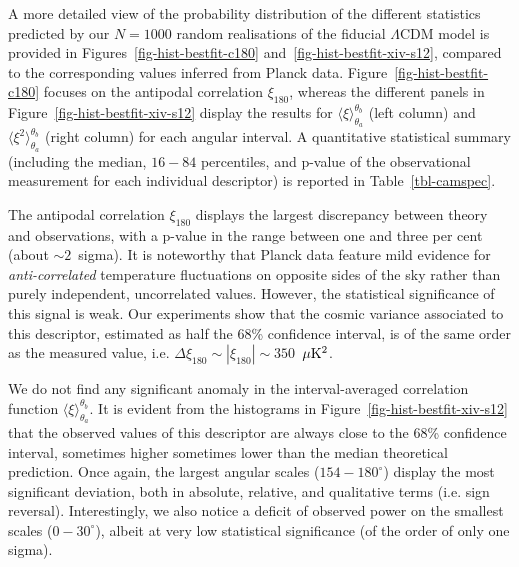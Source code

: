 \documentclass[apj,twocolumn,numberedappendix]{openjournal}
\begin{document}
A more detailed view of the probability distribution of the different statistics predicted by our $N=1000$ random realisations of the fiducial $\Lambda$CDM model is provided in Figures~\ref{fig-hist-bestfit-c180} and~\ref{fig-hist-bestfit-xiv-s12}, compared to the corresponding values inferred from Planck data.
Figure~\ref{fig-hist-bestfit-c180} focuses on the antipodal correlation $\xi_{180}$, whereas the different panels in Figure~\ref{fig-hist-bestfit-xiv-s12} display the results for
$\langle\xi\rangle_{\theta_a}^{\theta_b}$ (left column) and
$\langle\xi^2\rangle_{\theta_a}^{\theta_b}$ (right column)
for each angular interval.
A quantitative statistical summary (including the median, $16-84$ percentiles, and p-value of the observational measurement for each individual descriptor) is reported in Table~\ref{tbl-camspec}.


The antipodal correlation $\xi_{180}$ displays the largest discrepancy between theory and observations, with a p-value in the range between one and three per cent (about $\sim 2$~sigma).
It is noteworthy that Planck data feature mild evidence for \emph{anti-correlated} temperature fluctuations on opposite sides of the sky rather than purely independent, uncorrelated values.
However, the statistical significance of this signal is weak.
Our experiments show that the cosmic variance associated to this descriptor, estimated as half the 68\% confidence interval, is of the same order as the measured value, i.e. $\Delta\xi_{180} \sim |\xi_{180}| \sim 350$~$\rm \mu K^2$.
 

We do not find any significant anomaly in the interval-averaged correlation function $\langle\xi\rangle_{\theta_a}^{\theta_b}$.
It is evident from the histograms in Figure~\ref{fig-hist-bestfit-xiv-s12} that the observed values of this descriptor are always close to the 68\% confidence interval, sometimes higher sometimes lower than the median theoretical prediction.
Once again, the largest angular scales ($154-180^\circ$) display the most significant deviation, both in absolute, relative, and qualitative terms (i.e. sign reversal).
Interestingly, we also notice a deficit of observed power on the smallest scales ($0-30^\circ$), albeit at very low statistical significance (of the order of only one sigma).

\end{document}
